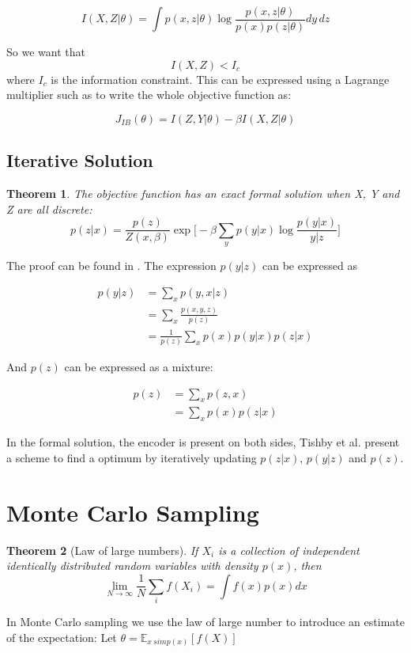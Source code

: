 \documentclass[10pt,oneside,openright]{report}
\newtheorem{theorem}{Theorem}
\begin{document}
$$ I(X, Z|\theta) = \int p(x, z|\theta) \log \frac{p(x, z|\theta)}{p(x)p(z|\theta)} dy\,dz $$

So we want that $$I(X, Z) < I_c$$ where $I_c$ is the information constraint. This can be expressed using a Lagrange multiplier such as to write the whole objective function as:

$$ J_{IB}(\theta) = I(Z, Y|\theta) - \beta I(X, Z|\theta)$$


\subsection{Iterative Solution}
\begin{theorem}
The objective function has an exact formal solution when X, Y and Z are all discrete:
$$ p(z|x) = \frac{p(z)}{Z(x, \beta)} \exp\Big[-\beta \sum_y p(y|x) \log\frac{p(y|x)}{y|z}\Big] $$
\end{theorem}

 The proof can be found in \cite{tishby}. The expression $p(y|z)$ can be expressed as 
 
 \begin{align}
p(y|z) &= \sum_x p(y, x|z)  \\
	 & = \sum_x \frac{p(x ,y, z)}{p(z)} \\
	 &= \frac{1}{p(z)} \sum_x p(x) p(y|x) p (z|x) 
\label{eq:y_given_z}
\end{align}

And $p(z)$ can be expressed as a mixture:
 
  \begin{align}
p(z) &= \sum_x p(z, x)  \\
	 &= \sum_x p(x) p(z|x)
\label{eq:z_post}
\end{align}

In the formal solution, the encoder is present on both sides, Tishby et al. present a scheme to find a optimum by iteratively updating $p(z|x)$, $p(y|z)$ and $p(z)$.

\section{Monte Carlo Sampling}
\begin{theorem}[Law of large numbers]
If $X_i$ is a collection of independent identically distributed random variables with density $p(x)$, then
$$ \lim_{N \to \infty} \frac{1}{N} \sum_i f(X_i) = \int f(x) p(x) dx $$
\end{theorem}

In Monte Carlo sampling we use the law of large number to introduce an estimate  of the expectation:
Let $\theta = \mathbb{E}_{x \ sim p(x)}[f(X)]$
\end{document}
